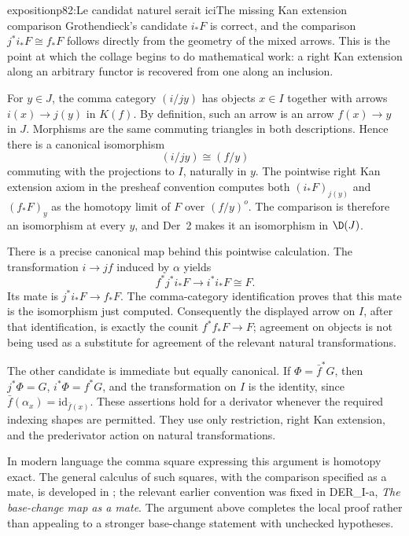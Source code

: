 \begin{dcomment}{exposition}{p82:Le candidat naturel serait ici}{The missing Kan extension comparison}
Grothendieck's candidate \(i_*F\) is correct, and the comparison \(j^*i_*F\cong f_*F\) follows directly from the geometry of the mixed arrows. This is the point at which the collage begins to do mathematical work: a right Kan extension along an arbitrary functor is recovered from one along an inclusion.

For \(y\in J\), the comma category \((i/jy)\) has objects \(x\in I\) together with arrows \(i(x)\to j(y)\) in \(K(f)\). By definition, such an arrow is an arrow \(f(x)\to y\) in \(J\). Morphisms are the same commuting triangles in both descriptions. Hence there is a canonical isomorphism
\[
 (i/jy)\cong(f/y)
\]
commuting with the projections to \(I\), naturally in \(y\). The pointwise right Kan extension axiom in the presheaf convention computes both
\((i_*F)_{j(y)}\) and \((f_*F)_y\) as the homotopy limit of \(F\) over \((f/y)^o\). The comparison is therefore an isomorphism at every \(y\), and Der~2 makes it an isomorphism in \(\D(J)\).

There is a precise canonical map behind this pointwise calculation. The transformation
\(i\to jf\) induced by \(\alpha\) yields
\[
 f^*j^*i_*F\longrightarrow i^*i_*F\cong F.
\]
Its mate is \(j^*i_*F\to f_*F\). The comma-category identification proves that this mate is the isomorphism just computed. Consequently the displayed arrow on \(I\), after that identification, is exactly the counit \(f^*f_*F\to F\); agreement on objects is not being used as a substitute for agreement of the relevant natural transformations.

The other candidate is immediate but equally canonical. If \(\Phi=\bar f^*G\), then \(j^*\Phi=G\), \(i^*\Phi=f^*G\), and the transformation on \(I\) is the identity, since \(\bar f(\alpha_x)=\mathrm{id}_{\bar f(x)}\). These assertions hold for a derivator whenever the required indexing shapes are permitted. They use only restriction, right Kan extension, and the prederivator action on natural transformations.

In modern language the comma square expressing this argument is homotopy exact. The general calculus of such squares, with the comparison specified as a mate, is developed in \citet[Proposition 1.26]{Groth2013}; the relevant earlier convention was fixed in DER\_I-a, \emph{The base-change map as a mate}. The argument above completes the local proof rather than appealing to a stronger base-change statement with unchecked hypotheses.
\end{dcomment}

